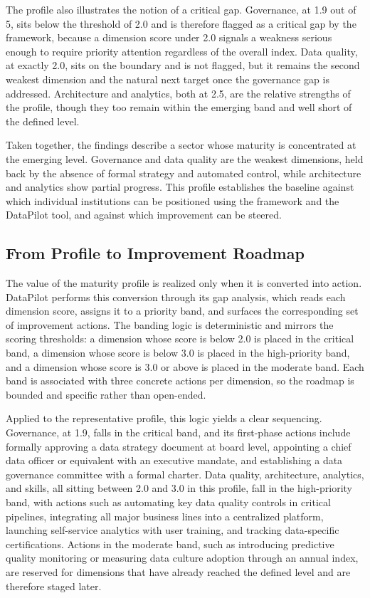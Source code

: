 The profile also illustrates the notion of a critical gap. Governance, at 1.9 out of 5, sits below the threshold of 2.0 and is therefore flagged as a critical gap by the framework, because a dimension score under 2.0 signals a weakness serious enough to require priority attention regardless of the overall index. Data quality, at exactly 2.0, sits on the boundary and is not flagged, but it remains the second weakest dimension and the natural next target once the governance gap is addressed. Architecture and analytics, both at 2.5, are the relative strengths of the profile, though they too remain within the emerging band and well short of the defined level.

Taken together, the findings describe a sector whose maturity is concentrated at the emerging level. Governance and data quality are the weakest dimensions, held back by the absence of formal strategy and automated control, while architecture and analytics show partial progress. This profile establishes the baseline against which individual institutions can be positioned using the framework and the DataPilot tool, and against which improvement can be steered.

\subsection{From Profile to Improvement Roadmap}

The value of the maturity profile is realized only when it is converted into action. DataPilot performs this conversion through its gap analysis, which reads each dimension score, assigns it to a priority band, and surfaces the corresponding set of improvement actions. The banding logic is deterministic and mirrors the scoring thresholds: a dimension whose score is below 2.0 is placed in the critical band, a dimension whose score is below 3.0 is placed in the high-priority band, and a dimension whose score is 3.0 or above is placed in the moderate band. Each band is associated with three concrete actions per dimension, so the roadmap is bounded and specific rather than open-ended.

Applied to the representative profile, this logic yields a clear sequencing. Governance, at 1.9, falls in the critical band, and its first-phase actions include formally approving a data strategy document at board level, appointing a chief data officer or equivalent with an executive mandate, and establishing a data governance committee with a formal charter. Data quality, architecture, analytics, and skills, all sitting between 2.0 and 3.0 in this profile, fall in the high-priority band, with actions such as automating key data quality controls in critical pipelines, integrating all major business lines into a centralized platform, launching self-service analytics with user training, and tracking data-specific certifications. Actions in the moderate band, such as introducing predictive quality monitoring or measuring data culture adoption through an annual index, are reserved for dimensions that have already reached the defined level and are therefore staged later.


